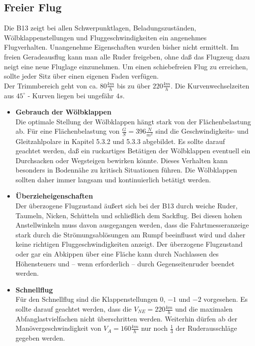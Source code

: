 \subsection{Freier Flug}
Die B13 zeigt bei allen Schwerpunktlagen, Beladungszuständen, Wölbklappenstellungen und Fluggeschwindigkeiten ein angenehmes Flugverhalten. Unangenehme Eigenschaften wurden bisher nicht ermittelt. Im freien Geradeausflug kann man alle Ruder freigeben, ohne daß das Flugzeug dazu neigt eine neue Fluglage einzunehmen. Um einen schiebefreien Flug zu erreichen, sollte jeder Sitz über einen eigenen Faden verfügen.\\
\newline
Der Trimmbereich geht von ca. $80 \frac{km}{h}$ bis zu über $220 \frac{km}{h}$. Die Kurvenwechselzeiten aus $45^{\circ}$ - Kurven liegen bei ungefähr $4s$.\\

\begin{itemize}
\item \textbf{Gebrauch der Wölbklappen}\\
Die optimale Stellung der Wölbklappen hängt stark von der Flächenbelastung ab. Für eine Flächenbelastung von $\frac{G}{S}=396 \frac{N}{m^2}$ sind die Geschwindigkeits- und Gleitzahlpolare in Kapitel 5.3.2 und 5.3.3 abgebildet. 
Es sollte darauf geachtet werden, daß ein ruckartiges Betätigen der Wölbklappen eventuell ein Durchsacken oder Wegsteigen bewirken könnte. Dieses Verhalten kann besonders in Bodennähe zu kritisch Situationen führen. Die Wölbklappen sollten daher immer langsam und kontinuierlich betätigt werden. 
\item \textbf{Überzieheigenschaften}\\
Der überzogene Flugzustand äußert sich bei der B13 durch weiche Ruder, Taumeln, Nicken, Schütteln und schließlich dem Sackflug. Bei diesen hohen Anstellwinkeln muss davon ausgegangen werden, dass die Fahrtmesseranzeige stark durch die Strömungsablösungen am Rumpf beeinflusst wird und daher keine richtigen Fluggeschwindigkeiten anzeigt.  Der überzogene Flugzustand oder gar ein Abkippen über eine Fläche kann durch Nachlassen des Höhensteuers und – wenn erforderlich – durch Gegenseitenruder beendet werden. 
\item \textbf{Schnellflug}\\
Für den Schnellflug sind die Klappenstellungen $0$, $-1$ und $-2$ vorgesehen. Es sollte darauf geachtet werden, dass die $V_{NE} = 220 \frac{km}{h}$  und die maximalen Abfanglastvielfachen nicht überschritten werden. Weiterhin dürfen ab der Manövergeschwindigkeit von $V_A = 160 \frac{km}{h}$ nur noch $\frac{1}{3}$ der Ruderausschläge gegeben werden. 

\end{itemize}
\newpage
